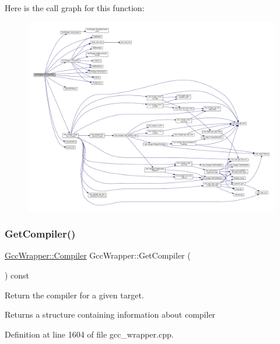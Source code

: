 Here is the call graph for this function\+:
\nopagebreak
\begin{figure}[H]
\begin{center}
\leavevmode
\includegraphics[width=350pt]{d4/dbf/classGccWrapper_a6ddec058ff78ec89be3b4f7b65b7d669_cgraph}
\end{center}
\end{figure}
\mbox{\label{classGccWrapper_a2de0745c83e81e349b84a99b68b2519e}} 
\subsubsection{\texorpdfstring{Get\+Compiler()}{GetCompiler()}}
{\footnotesize\ttfamily \hyperlink{classGccWrapper_1_1Compiler}{Gcc\+Wrapper\+::\+Compiler} Gcc\+Wrapper\+::\+Get\+Compiler (\begin{DoxyParamCaption}{ }\end{DoxyParamCaption}) const\hspace{0.3cm}{\ttfamily [private]}}



Return the compiler for a given target. 

\begin{DoxyReturn}{Returns}
a structure containing information about compiler 
\end{DoxyReturn}


Definition at line 1604 of file gcc\+\_\+wrapper.\+cpp.




